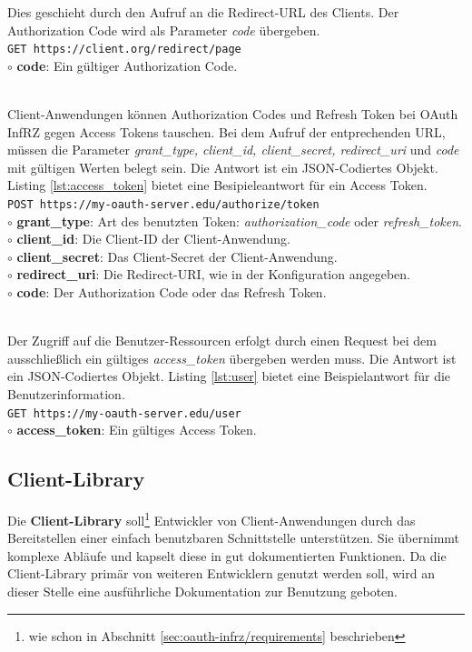 \documentclass[12pt,a4paper,pointednumbers,abstracton]{scrartcl}
\newcommand{\code}[1]{\small\lstinline[style=InlinePHP]!#1!\normalsize}
\begin{document}
\begin{description}
		Dies geschieht durch den Aufruf an die Redirect-URL des Clients.
		Der Authorization Code wird als Parameter \emph{code} übergeben.\\
		\code{GET https://client.org/redirect/page}\\
		$\circ$ \textbf{code}: Ein gültiger Authorization Code.
	\newpage
	\item[Token-Austausch] \hfill \\
		Client-Anwendungen können Authorization Codes und Refresh Token bei OAuth InfRZ gegen Access Tokens tauschen.
		Bei dem Aufruf der entprechenden URL, müssen die Parameter \emph{grant\_type, client\_id, client\_secret, redirect\_uri} und \emph{code} mit gültigen Werten belegt sein.
		Die Antwort ist ein JSON-Codiertes Objekt.
		Listing \ref{lst:access_token} bietet eine Besipieleantwort für ein Access Token.\\
		\code{POST https://my-oauth-server.edu/authorize/token}\\
		$\circ$ \textbf{grant\_type}: Art des benutzten Token: \emph{authorization\_code} oder \emph{refresh\_token}. \\
		$\circ$ \textbf{client\_id}: Die Client-ID der Client-Anwendung.\\
		$\circ$ \textbf{client\_secret}: Das Client-Secret der Client-Anwendung.\\
		$\circ$ \textbf{redirect\_uri}: Die Redirect-URI, wie in der Konfiguration angegeben.\\
		$\circ$ \textbf{code}: Der Authorization Code oder das Refresh Token.\\
	\item[Ressourcenzugriff] \hfill \\
		Der Zugriff auf die Benutzer-Ressourcen erfolgt durch einen Request bei dem ausschließlich ein gültiges \emph{access\_token} übergeben werden muss.
		Die Antwort ist ein JSON-Codiertes Objekt.
		Listing \ref{lst:user} bietet eine Beispielantwort für die Benutzerinformation.\\
		\code{GET https://my-oauth-server.edu/user}\\
		$\circ$ \textbf{access\_token}: Ein gültiges Access Token.
\end{description}

\subsection{Client-Library}
\label{sec:oauth-infrz/client}

Die \textbf{Client-Library} soll\footnote{wie schon in Abschnitt \ref{sec:oauth-infrz/requirements} beschrieben} Entwickler von Client-Anwendungen durch das Bereitstellen einer einfach benutzbaren Schnittstelle unterstützen.
Sie übernimmt komplexe Abläufe und kapselt diese in gut dokumentierten Funktionen.
Da die Client-Library primär von weiteren Entwicklern genutzt werden soll, wird an dieser Stelle eine ausführliche Dokumentation zur Benutzung geboten.
\end{document}
